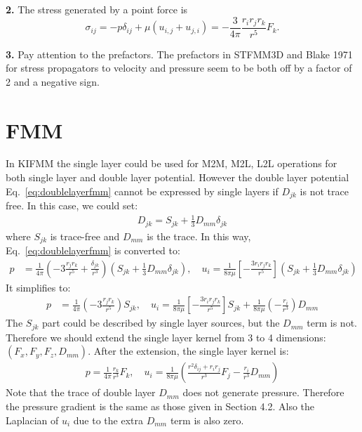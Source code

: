 \documentclass[11pt]{article}
\begin{document}
\textbf{2.} The stress generated by a point force is 
$$\sigma_{ij} = -p\delta_{ij} + \mu \left(u_{i,j}+u_{j,i}\right) = -\frac{3}{4\pi}\frac{r_ir_jr_k}{r^5}F_k. $$ 

\textbf{3. } Pay attention to the prefactors. The prefactors in STFMM3D and Blake 1971 for stress propagators to velocity and pressure seem to be both off by a factor of 2 and a negative sign.

\section{FMM}
In KIFMM the single layer could be used for M2M, M2L, L2L operations for both single layer and double layer potential. However the double layer potential Eq.~\ref{eq:doublelayerfmm} cannot be expressed by single layers if $D_{jk}$ is not trace free. In this case, we could set:
\begin{align}
	D_{jk} = S_{jk} + \frac{1}{3}D_{mm}\delta_{jk}
\end{align}  
where $S_{jk}$ is trace-free and $D_{mm}$ is the trace. In this way, Eq.~\ref{eq:doublelayerfmm} is converted to:
\begin{align}
		p& =\frac{1}{4\pi}\left(-3\frac{r_jr_k}{r^5} + \frac{\delta_{jk}}{r^3}\right)\left(S_{jk} + \frac{1}{3}D_{mm}\delta_{jk}\right), \quad u_i = \frac{1}{8\pi\mu}\left[ - \frac{3r_ir_jr_k}{r^5} \right] \left(S_{jk} + \frac{1}{3}D_{mm}\delta_{jk}\right)
\end{align}
It simplifies to:
\begin{align}
p& =\frac{1}{4\pi}\left(-3\frac{r_jr_k}{r^5}\right) S_{jk}, \quad u_i = \frac{1}{8\pi\mu}\left[ - \frac{3r_ir_jr_k}{r^5} \right]S_{jk} + \frac{1}{8\pi\mu}\left(-\frac{r_i}{r^3}\right)D_{mm}
\end{align}
The $S_{jk}$ part could be described by single layer sources, but the $D_{mm}$ term is not. Therefore we should extend the single layer kernel from 3 to 4 dimensions: $(F_x,F_y,F_z,D_{mm})$.
After the extension, the single layer kernel is:
\begin{align}\label{eq:singlelayerfmm}
	p=\frac{1}{4\pi} \frac{r_k}{r^3} F_k,\quad u_i = \frac{1}{8\pi\mu}\left(\frac{r^2\delta_{ij}+r_ir_j}{r^3} F_j -\frac{r_i}{r^3}D_{mm}\right)
\end{align}
Note that the trace of double layer $D_{mm}$ does not generate pressure. Therefore the pressure gradient is the same as those given in Section 4.2. Also the Laplacian of $u_i$ due to the extra $D_{mm}$ term is also zero. 
\end{document}
